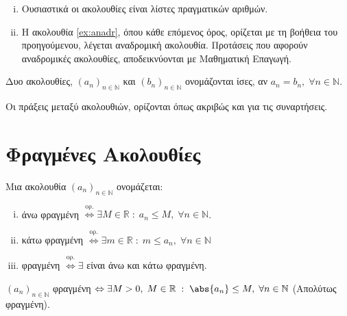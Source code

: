 \documentclass[main.tex]{subfiles}
\begin{document}
\begin{rem}
\item {}
    \begin{enumerate}[i)]
        \item Ουσιαστικά οι ακολουθίες είναι λίστες πραγματικών αριθμών.
        \item Η ακολουθία \ref{ex:anadr}, όπου κάθε επόμενος όρος, ορίζεται με τη 
            βοήθεια του προηγούμενου, λέγεται αναδρομική ακολουθία. Προτάσεις που 
            αφορούν αναδρομικές ακολουθίες, αποδεικνύονται με Μαθηματική Επαγωγή.
    \end{enumerate}
\end{rem}


\begin{dfn}
    Δυο ακολουθίες, $(a_{n})_{n \in \mathbb{N}}$  και $ (b_{n})_{n \in \mathbb{N}} $
    ονομάζονται ίσες, αν $ a_{n} = b_{n}, \; \forall n \in \mathbb{N} $.
\end{dfn}

\begin{dfn}
    Οι πράξεις μεταξύ ακολουθιών, ορίζονται όπως ακριβώς και για τις συναρτήσεις.
\end{dfn}

\section{Φραγμένες Ακολουθίες}

\begin{dfn}
\item {}
    Μια ακολουθία $ (a_{n})_{n \in \mathbb{N}} $ ονομάζεται:
    \begin{enumerate}[i)]
        \item άνω φραγμένη $ \overset{\text{ορ.}}{\Leftrightarrow} \exists M \in 
            \mathbb{R} \; : \; a_{n} \leq M, \; \forall n \in \mathbb{N}$.
        \item κάτω φραγμένη $ \overset{\text{ορ.}}{\Leftrightarrow} \exists m \in 
            \mathbb{R} \; : \; m \leq a_{n}, \; \forall n \in \mathbb{N}  $
        \item φραγμένη $ \overset{\text{ορ.}}{\Leftrightarrow} \exists$ είναι άνω και 
            κάτω φραγμένη.
    \end{enumerate}

    \begin{prop}
        $ (a_{n})_{n \in \mathbb{N}} $ φραγμένη $ \Leftrightarrow \exists M>0, \; M \in 
        \mathbb{R} \; : \; \abs{a_{n}} \leq M, \; \forall n \in \mathbb{N} $
        (Απολύτως φραγμένη).
    \end{prop}
\end{dfn}
\end{document}
